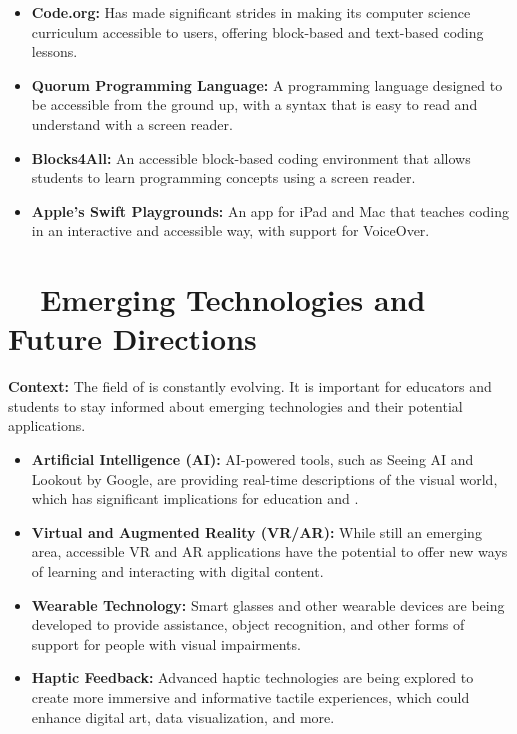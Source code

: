 \begin{itemize}
	\item \textbf{Code.org:} Has made significant strides in making its computer science curriculum accessible to  users, offering block-based and text-based coding lessons.
	\item \textbf{Quorum Programming Language:} A programming language designed to be accessible from the ground up, with a syntax that is easy to read and understand with a screen reader.
	\item \textbf{Blocks4All:} An accessible block-based coding environment that allows students to learn programming concepts using a screen reader.
	\item \textbf{Apple's Swift Playgrounds:} An app for iPad and Mac that teaches coding in an interactive and accessible way, with support for VoiceOver.
\end{itemize}

\section{~~Emerging Technologies and Future Directions}\label{app4:emerging-tech}

\noindent
\textbf{Context:} The field of  is constantly evolving. It is important for educators and students to stay informed about emerging technologies and their potential applications.

\begin{itemize}
	\item \textbf{Artificial Intelligence (AI):} AI-powered tools, such as Seeing AI and Lookout by Google, are providing real-time descriptions of the visual world, which has significant implications for education and .
	\item \textbf{Virtual and Augmented Reality (VR/AR):} While still an emerging area, accessible VR and AR applications have the potential to offer new ways of learning and interacting with digital content.
	\item \textbf{Wearable Technology:} Smart glasses and other wearable devices are being developed to provide  assistance, object recognition, and other forms of support for people with visual impairments.
	\item \textbf{Haptic Feedback:} Advanced haptic technologies are being explored to create more immersive and informative tactile experiences, which could enhance digital art, data visualization, and more.
\end{itemize}

